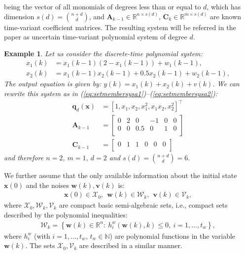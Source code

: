 \documentclass[twocolumn]{autart}
\newtheorem{example}{Example} {\normalfont}{\normalfont}
\begin{document}
being the vector of all monomials of degrees less than or equal to $d$, which has dimension $s(d)={n+d \choose d} $,
and $\mathbf{A}_{k-1} \in \mathbb{R}^{n\times s(d)}$, $\mathbf{C}_k \in \mathbb{R}^{m\times s(d)}$
are known time-variant coefficient  matrices. The resulting system will be referred in the paper as uncertain time-variant polynomial system
of degree $d$.
{
\begin{example}
 \label{ex:0}
Let us consider the discrete-time polynomial system:
\begin{align}
\nonumber
 x_1(k)&= x_1(k-1)\left(2-x_1(k-1)\right)+w_1(k-1),\\
   \nonumber
   x_2(k)&= x_1(k-1)x_2(k-1)+0.5x_2(k-1)+w_2(k-1),
\end{align}
The output equation is given by:
${y}(k)=x_1(k)+x_2(k)+{v}(k)$. 
We can rewrite this system as in (\ref{eq:setmembersysa1})--(\ref{eq:setmembersysa2}):
\begin{align}
\nonumber
 \mathbf{q}_d(\mathbf{x})&=[1,x_1,x_2,x_1^2,x_1x_2,x_2^2]^\top\\
\nonumber
 \mathbf{A}_{k-1}&=\left[
\begin{matrix}
 0&2&0&-1&0&0\\
 0&0&0.5&0&1&0\\
\end{matrix}
\right]\\
\nonumber
\mathbf{C}_{k-1}&=\left[
\begin{matrix}
 0&1&1&0&0&0\\
 \end{matrix}
\right]
\end{align}
and therefore $n=2$, $m=1$, $d=2$ and $s(d)={n+d \choose d}=6$.
\end{example}}

We further assume that the only available information about the initial state
$\mathbf{x}(0)$ and the noises $\mathbf{w}(k),\mathbf{v}(k)$ is:
\begin{equation}
\label{eq:sm}
\begin{array}{l}
\mathbf{x}(0)\in \mathcal{X}_0, ~~\mathbf{w}(k)\in \mathcal{W}_k,~~\mathbf{v}(k)\in \mathcal{V}_k,
 \end{array}
\end{equation}
where $\mathcal{X}_0,\mathcal{W}_k,\mathcal{V}_k$ are compact basic semi-algebraic sets, i.e.,
compact sets  described by the polynomial inequalities:
\begin{equation}
\label{eq:semi}
\begin{array}{l}
\mathcal{W}_k=\left\{\mathbf{w}(k)\in \mathbb{R}^n: ~h^w_i(\mathbf{w}(k),k)\leq0, ~i=1,\dots,t_w\right\},
 \end{array}
\end{equation}
where $h^w_i$ (with $i=1,\dots,t_w$, $t_w \in \mathbb{N}$) are polynomial functions in the variable $\mathbf{w}(k)$. The  sets
$\mathcal{X}_0,\mathcal{V}_k$ are described in a similar manner.
\end{document}
